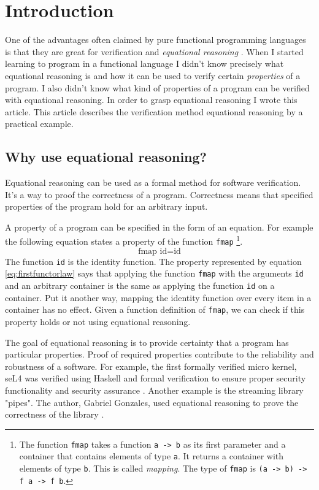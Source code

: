 \section{Introduction}
\label{sec:This}

One of the advantages often claimed by pure functional programming languages is that they are great for \gls{verification} and \emph{equational reasoning} \cite{Wadler87}.
When I started learning to program in a functional language I didn't know precisely what equational reasoning is and how it can be used to verify certain \emph{properties} of a program. I also didn't know what kind of properties of a program can be verified with equational reasoning. In order to grasp equational reasoning I wrote this article.
This article describes the verification method equational reasoning by a practical example. 

\subsection{Why use equational reasoning?}

Equational reasoning can be used as a formal method for software verification. It's a way to proof the correctness of a program. Correctness means that specified properties of the program hold for an arbitrary input. 

A property of a program can be specified in the form of an equation. For example the following equation states a property of the function \verb|fmap|  \footnote{The function \verb|fmap| takes a function \verb|a -> b| as its first parameter and a container that contains elements of type \verb|a|. It returns a container with elements of type \verb|b|. This is called \emph{mapping}. The type of \verb|fmap| is \verb|(a -> b) -> f a -> f b|.}.
\begin{equation}
  \label{eq:firstfunctorlaw}
\text{fmap } \text{id}  =  \text{id}  
\end{equation}
 The function \verb|id| is the identity function. The property represented by equation \ref{eq:firstfunctorlaw} says that applying the function \verb|fmap| with the arguments \verb|id| and an arbitrary container is the same as applying the function \verb|id| on a container. Put it another way, mapping the identity function over every item in a container has no effect. Given a function definition of \verb|fmap|, we can check if this property holds or not using equational reasoning.

The goal of equational reasoning is to provide certainty that a program has particular properties. Proof of required properties contribute to the reliability and robustness of a software. 
For example, the first formally verified micro kernel, seL4 was verified using Haskell and formal verification to ensure proper security functionality and security assurance \cite{Klein09}.
Another example is the streaming library "pipes". The author, Gabriel Gonzales, used equational reasoning to prove the correctness of the library \cite{gonzales13}.

